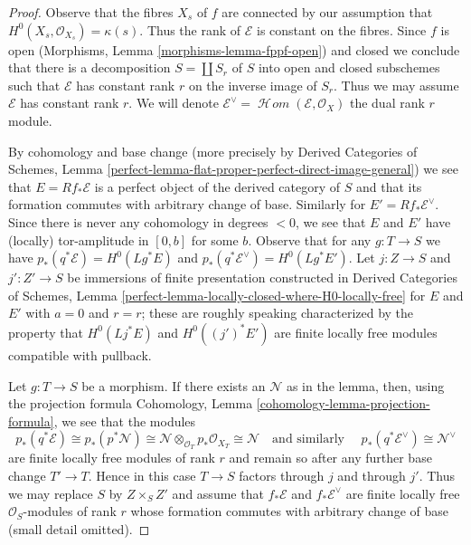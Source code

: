 \documentclass[10pt,a4paper]{amsart}
\theoremstyle{plain}
\theoremstyle{definition}
\theoremstyle{remark}
\numberwithin{equation}{subsection}
\def\SheafHom{\mathop{\mathcal{H}\!\mathit{om}}\nolimits}
\begin{document}
\begin{proof}
Observe that the fibres $X_s$ of $f$ are connected by our assumption
that $H^0(X_s, \mathcal{O}_{X_s}) = \kappa(s)$. Thus the rank of
$\mathcal{E}$ is constant on the fibres. Since $f$ is open
(Morphisms, Lemma \ref{morphisms-lemma-fppf-open}) and closed
we conclude that there is a decomposition $S = \coprod S_r$
of $S$ into open and closed subschemes such that $\mathcal{E}$
has constant rank $r$ on the inverse image of $S_r$.
Thus we may assume $\mathcal{E}$ has constant rank $r$.
We will denote $\mathcal{E}^\vee = \SheafHom(\mathcal{E}, \mathcal{O}_X)$
the dual rank $r$ module.

\medskip\noindent
By cohomology and base change (more precisely by
Derived Categories of Schemes, Lemma
\ref{perfect-lemma-flat-proper-perfect-direct-image-general})
we see that $E = Rf_*\mathcal{E}$ is a perfect object of the
derived category of $S$ and that its formation commutes with
arbitrary change of base. Similarly for $E' = Rf_*\mathcal{E}^\vee$.
Since there is never any cohomology in degrees $< 0$, we see that
$E$ and $E'$ have (locally) tor-amplitude in $[0, b]$ for some $b$.
Observe that for any $g : T \to S$ we have
$p_*(q^*\mathcal{E}) = H^0(Lg^*E)$ and
$p_*(q^*\mathcal{E}^\vee) = H^0(Lg^*E')$.
Let $j : Z \to S$ and $j' : Z' \to S$ be immersions
of finite presentation constructed in Derived Categories of Schemes, Lemma
\ref{perfect-lemma-locally-closed-where-H0-locally-free}
for $E$ and $E'$ with $a = 0$ and $r = r$; these are roughly speaking
characterized by the property that $H^0(Lj^*E)$ and $H^0((j')^*E')$
are finite locally free modules compatible with pullback.

\medskip\noindent
Let $g : T \to S$ be a morphism. If there exists an $\mathcal{N}$
as in the lemma, then, using the projection formula
Cohomology, Lemma \ref{cohomology-lemma-projection-formula},
we see that the modules
$$
p_*(q^*\mathcal{E}) \cong
p_*(p^*\mathcal{N}) \cong
\mathcal{N} \otimes_{\mathcal{O}_T} p_*\mathcal{O}_{X_T} \cong
\mathcal{N}\quad\text{and similarly }\quad
p_*(q^*\mathcal{E}^\vee) \cong \mathcal{N}^\vee
$$
are finite locally free modules of rank $r$
and remain so after any further base change $T' \to T$.
Hence in this case $T \to S$ factors through $j$ and through $j'$.
Thus we may replace $S$ by $Z \times_S Z'$ and assume that
$f_*\mathcal{E}$ and $f_*\mathcal{E}^\vee$ are finite locally free
$\mathcal{O}_S$-modules of rank $r$
whose formation commutes with arbitrary change of base
(small detail omitted).


\end{proof}
\end{document}
